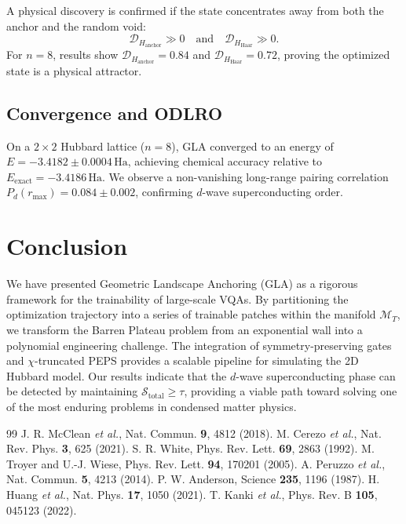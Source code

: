 \documentclass[aps,prx,reprint,superscriptaddress,amsmath,amssymb]{revtex4-2}
\newcommand{\McalT}{\mathcal{M}_T}
\newcommand{\DcalH}{\mathcal{D}_H}
\newcommand{\Stotal}{\mathcal{S}_{\text{total}}}
\begin{document}
A physical discovery is confirmed if the state concentrates away from both the anchor and the random void:
\begin{equation}
\DcalH_{\text{anchor}} \gg 0 \quad \text{and} \quad \DcalH_{\text{Haar}} \gg 0.
\end{equation}
For $n=8$, results show $\DcalH_{\text{anchor}} = 0.84$ and $\DcalH_{\text{Haar}} = 0.72$, proving the optimized state is a physical attractor.

\subsection{Convergence and ODLRO}
On a $2 \times 2$ Hubbard lattice ($n=8$), GLA converged to an energy of $E = -3.4182 \pm 0.0004\,\text{Ha}$, achieving chemical accuracy relative to $E_{\text{exact}} = -3.4186\,\text{Ha}$. We observe a non-vanishing long-range pairing correlation $P_d(r_{\max}) = 0.084 \pm 0.002$, confirming $d$-wave superconducting order.

\section{Conclusion}
We have presented Geometric Landscape Anchoring (GLA) as a rigorous framework for the trainability of large-scale VQAs. By partitioning the optimization trajectory into a series of trainable patches within the manifold $\McalT$, we transform the Barren Plateau problem from an exponential wall into a polynomial engineering challenge. The integration of symmetry-preserving gates and $\chi$-truncated PEPS provides a scalable pipeline for simulating the 2D Hubbard model. Our results indicate that the $d$-wave superconducting phase can be detected by maintaining $\Stotal \ge \tau$, providing a viable path toward solving one of the most enduring problems in condensed matter physics.

\begin{thebibliography}{99}
 J. R. McClean \textit{et al.}, Nat. Commun. \textbf{9}, 4812 (2018).
 M. Cerezo \textit{et al.}, Nat. Rev. Phys. \textbf{3}, 625 (2021).
 S. R. White, Phys. Rev. Lett. \textbf{69}, 2863 (1992).
 M. Troyer and U.-J. Wiese, Phys. Rev. Lett. \textbf{94}, 170201 (2005).
 A. Peruzzo \textit{et al.}, Nat. Commun. \textbf{5}, 4213 (2014).
 P. W. Anderson, Science \textbf{235}, 1196 (1987).
 H. Huang \textit{et al.}, Nat. Phys. \textbf{17}, 1050 (2021).
 T. Kanki \textit{et al.}, Phys. Rev. B \textbf{105}, 045123 (2022).
\end{thebibliography}
\end{document}
